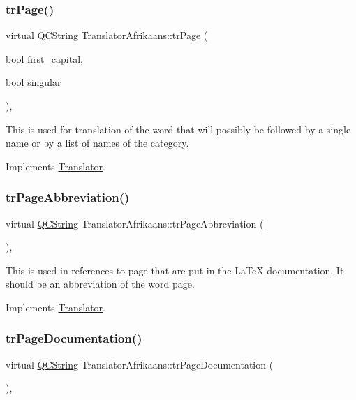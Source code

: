 \subsubsection{\texorpdfstring{trPage()}{trPage()}}
{\footnotesize\ttfamily virtual \mbox{\hyperlink{class_q_c_string}{Q\+C\+String}} Translator\+Afrikaans\+::tr\+Page (\begin{DoxyParamCaption}\item[{bool}]{first\+\_\+capital,  }\item[{bool}]{singular }\end{DoxyParamCaption})\hspace{0.3cm}{\ttfamily [inline]}, {\ttfamily [virtual]}}

This is used for translation of the word that will possibly be followed by a single name or by a list of names of the category. 

Implements \mbox{\hyperlink{class_translator}{Translator}}.

\mbox{\label{class_translator_afrikaans_ab5ffe4358c524e4fad18236e8d9145d4}} 
\subsubsection{\texorpdfstring{trPageAbbreviation()}{trPageAbbreviation()}}
{\footnotesize\ttfamily virtual \mbox{\hyperlink{class_q_c_string}{Q\+C\+String}} Translator\+Afrikaans\+::tr\+Page\+Abbreviation (\begin{DoxyParamCaption}{ }\end{DoxyParamCaption})\hspace{0.3cm}{\ttfamily [inline]}, {\ttfamily [virtual]}}

This is used in references to page that are put in the La\+TeX documentation. It should be an abbreviation of the word page. 

Implements \mbox{\hyperlink{class_translator}{Translator}}.

\mbox{\label{class_translator_afrikaans_a6ded0ba65a700083145793f1206be010}} 
\subsubsection{\texorpdfstring{trPageDocumentation()}{trPageDocumentation()}}
{\footnotesize\ttfamily virtual \mbox{\hyperlink{class_q_c_string}{Q\+C\+String}} Translator\+Afrikaans\+::tr\+Page\+Documentation (\begin{DoxyParamCaption}{ }\end{DoxyParamCaption})\hspace{0.3cm}{\ttfamily [inline]}, {\ttfamily [virtual]}}

